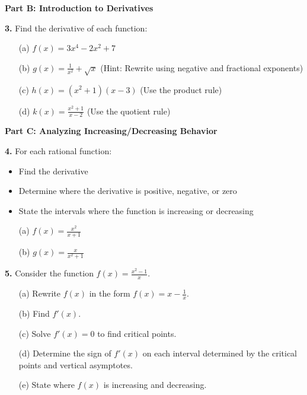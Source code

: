 \documentclass[12pt]{article}
\begin{document}
\newpage

\textbf{Part B: Introduction to Derivatives}

\textbf{3.} Find the derivative of each function:

\begin{enumerate}
\item[(a)] $f(x) = 3x^4 - 2x^2 + 7$
\vspace{2cm}

\item[(b)] $g(x) = \frac{1}{x^2} + \sqrt{x}$ (Hint: Rewrite using negative and fractional exponents)
\vspace{2cm}

\item[(c)] $h(x) = (x^2 + 1)(x - 3)$ (Use the product rule)
\vspace{3cm}

\item[(d)] $k(x) = \frac{x^2 + 1}{x - 2}$ (Use the quotient rule)
\vspace{3cm}
\end{enumerate}

\textbf{Part C: Analyzing Increasing/Decreasing Behavior}

\textbf{4.} For each rational function:
\begin{itemize}
\item Find the derivative
\item Determine where the derivative is positive, negative, or zero
\item State the intervals where the function is increasing or decreasing
\end{itemize}

\begin{enumerate}
\item[(a)] $f(x) = \frac{x^2}{x + 1}$
\vspace{5cm}

\item[(b)] $g(x) = \frac{x}{x^2 + 1}$
\vspace{5cm}
\end{enumerate}

\newpage

\textbf{5.} Consider the function $f(x) = \frac{x^2 - 1}{x}$.

\begin{enumerate}
\item[(a)] Rewrite $f(x)$ in the form $f(x) = x - \frac{1}{x}$.
\vspace{1cm}

\item[(b)] Find $f'(x)$.
\vspace{2cm}

\item[(c)] Solve $f'(x) = 0$ to find critical points.
\vspace{2cm}

\item[(d)] Determine the sign of $f'(x)$ on each interval determined by the critical points and vertical asymptotes.
\vspace{3cm}

\item[(e)] State where $f(x)$ is increasing and decreasing.
\vspace{2cm}
\end{enumerate}
\end{document}
